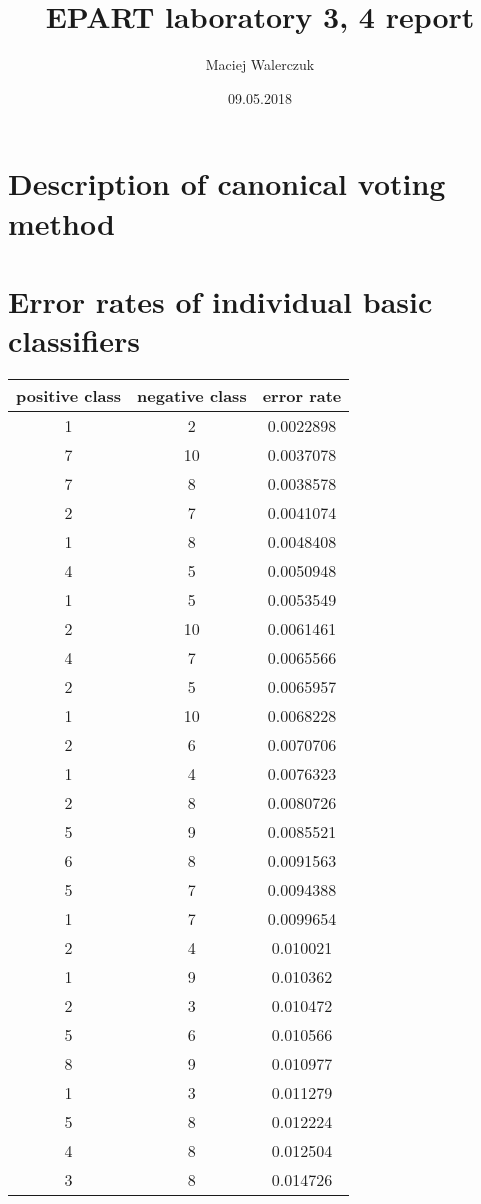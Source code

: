 \documentclass[a4paper, 11pt, wide]{article}
\title{EPART laboratory 3, 4 report}
\author{Maciej Walerczuk}
\date{09.05.2018}
\begin{document}
  \maketitle
  \section{Description of canonical voting method}
  \section{Error rates of individual basic classifiers}
  \begin{table}[H]
\begin{center}
{\tiny
\begin{tabular}{ |c|c|c| } 
 \hline
 positive class & negative class & error rate \\ 
 \hline
    1 & 2 & 0.0022898 \\ 
    7 & 10 & 0.0037078 \\ 
    7 & 8 & 0.0038578 \\
    2 & 7 & 0.0041074 \\
    1 & 8 & 0.0048408 \\
    4 & 5 & 0.0050948 \\
    1 & 5 & 0.0053549 \\
    2 & 10 & 0.0061461 \\
    4 & 7 & 0.0065566 \\
    2 & 5 & 0.0065957 \\
    1 & 10 & 0.0068228 \\
    2 & 6 & 0.0070706 \\
    1 & 4 & 0.0076323 \\
    2 & 8 & 0.0080726 \\
    5 & 9 & 0.0085521 \\
    6 & 8 & 0.0091563 \\
    5 & 7 & 0.0094388 \\
    1 & 7 & 0.0099654 \\
    2 & 4 & 0.010021 \\
    1 & 9 & 0.010362 \\
    2 & 3 & 0.010472 \\
    5 & 6 & 0.010566 \\
    8 & 9 & 0.010977 \\
    1 & 3 & 0.011279 \\
    5 & 8 & 0.012224 \\
    4 & 8 & 0.012504 \\
    3 & 8 & 0.014726 \\

\end{tabular}}
\end{center}
\end{table}
\end{document}
